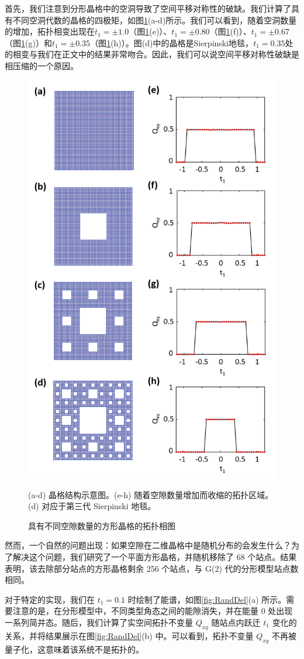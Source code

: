 首先，我们注意到分形晶格中的空洞导致了空间平移对称性的破缺。我们计算了具有不同空洞代数的晶格的四极矩，如图\ref{fig:Reason}(a-d)所示。我们可以看到，随着空洞数量的增加，拓扑相变出现在$t_1=\pm1.0$（图\ref{fig:Reason}(e)）、$t_1=\pm0.80$（图\ref{fig:Reason}(f)）、$t_1=\pm0.67$（图\ref{fig:Reason}(g)）和$t_1=\pm0.35$（图\ref{fig:Reason}(h)）。图(d)中的晶格是Sierpinski地毯，$t_1=0.35$处的相变与我们在正文中的结果非常吻合。因此，我们可以说空间平移对称性破缺是相压缩的一个原因。

\begin{figure}[htbp]
    \centering
    \includegraphics[width=0.5\linewidth]{figure/HOTITheo/Reason.png}
    \caption{具有不同空隙数量的方形晶格的拓扑相图}(a-d) 晶格结构示意图。(e-h) 随着空隙数量增加而收缩的拓扑区域。(d) 对应于第三代 Sierpinski 地毯。
    \label{fig:Reason}
\end{figure}

然而，一个自然的问题出现：如果空隙在二维晶格中是随机分布的会发生什么？为了解决这个问题，我们研究了一个平面方形晶格，并随机移除了 68 个站点。结果表明，该去除部分站点的方形晶格剩余 256 个站点，与 G(2) 代的分形模型站点数相同。

对于特定的实现，我们在 \( t_1 = 0.1 \) 时绘制了能谱，如图\ref{fig:RandDel}(a) 所示。需要注意的是，在分形模型中，不同类型角态之间的能隙消失，并在能量 \( 0 \) 处出现一系列简并态。随后，我们计算了实空间拓扑不变量 \( Q_{xy} \) 随站点内跃迁 \( t_1 \) 变化的关系，并将结果展示在图\ref{fig:RandDel}(b) 中。可以看到，拓扑不变量 \( Q_{xy} \) 不再被量子化，这意味着该系统不是拓扑的。

